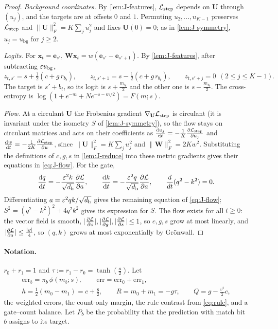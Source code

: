 \begin{proof}
\emph{Background coordinates.} By \cref{lem:J-features}, $\mathcal L_{\mathrm{step}}$ depends on $\mathbf U$ through $(u_j)$, and the targets are at offsets $0$ and $1$.
Permuting $u_2,\ldots,u_{K-1}$ preserves $\mathcal L_{\mathrm{step}}$ and $\|\mathbf U\|_F^2=K\sum_ju_j^2$ and fixes $\mathbf U(0)=0$; as in \cref{lem:J-symmetry},
$u_j=u_{\mathrm{bg}}$ for $j\ge2$.

\emph{Logits.} For $\bm x_t=\bm e_{s'}$, $\mathbf W\bm x_t=w(\bm e_{s'}-\bm e_{s'+1})$. By \cref{lem:J-features}, after subtracting $\varepsilon u_{\mathrm{bg}}$,
 $z_{t,s'}=s+\tfrac{1}{2}(c+g\,r_{b_t}),\qquad z_{t,s'+1}=s-\tfrac{1}{2}(c+g\,r_{b_t}),\qquad z_{t,s'+j}=0\ \ (2\le j\le K-1).$ 
The target is $s'+b_t$, so its logit is $s+\frac{m_{b_t}}{2}$ and the other one is $s-\frac{m_{b_t}}{2}$. The cross-entropy is
$\log(1+e^{-m}+Ne^{-s-m/2})=F(m;s)$.

\emph{Flow.} At a circulant $\mathbf U$ the Frobenius gradient $\nabla_{\mathbf U}\mathcal L_{\mathrm{step}}$ is circulant (it is invariant under the isometry $S$ of
\cref{lem:J-symmetry}), so the flow stays on circulant matrices and acts on their coefficients as $\ddt{u_j}=-\frac{1}{K}\pd{\Lstep}{u_j}$ and $\ddt{w}=-\frac{1}{2K}\pd{\Lstep}{w}$, since
$\|\mathbf U\|_F^2=K\sum_ju_j^2$ and $\|\mathbf W\|_F^2=2Kw^2$. Substituting the definitions of $c,g,s$ in \cref{lem:J-reduce}
into these metric gradients gives their equations in \cref{eq:J-flow}.
For the gate,
\begin{gather*}
 \ddt{q}=-\frac{\initscale^2k}{\sqrt{d_{\mathrm h}}}\pd{\mathcal L}{a},\qquad \ddt{k}=-\frac{\initscale^2q}{\sqrt{d_{\mathrm h}}}\pd{\mathcal L}{a},\qquad \frac{d}{dt}(q^2-k^2)=0.
\end{gather*}
Differentiating $a=\varepsilon^2qk/\sqrt{d_{\mathrm h}}$ gives the remaining equation of \cref{eq:J-flow}; $S^2=(q^2-k^2)^2+4q^2k^2$ gives its expression for $S$. The flow exists for all $t\ge0$: the vector field is smooth, $|\pd{\mathcal L}{c}|,|\pd{\mathcal L}{g}|,|\pd{\mathcal L}{s}|\le1$, so
$c,g,s$ grow at most linearly, and $|\pd{\mathcal L}{a}|\le\frac{|g|}{4}$, so $(q,k)$ grows at most exponentially by Gr\"onwall.
\end{proof}

\paragraph{Notation.} $r_0+r_1=1$ and $\tau:=r_1-r_0=\tanh(\frac{a}{2})$. Let
\begin{gather*}
 \mathrm{err}_b=\pi_b\,\phi(m_b;s),\qquad \mathrm{err}=\mathrm{err}_0+\mathrm{err}_1,\\
 h=\tfrac{1}{2}(m_0-m_1)=c+\tfrac{g}{2},\qquad R=m_0+m_1=-g\tau,\qquad Q=g-\tfrac{v^2}{2}c,
\end{gather*}
the weighted errors, the count-only margin, the rule contrast from \cref{eq:rule}, and a gate--count balance. Let $P_b$ be the
probability that the prediction with match bit $b$ assigns to its target.

